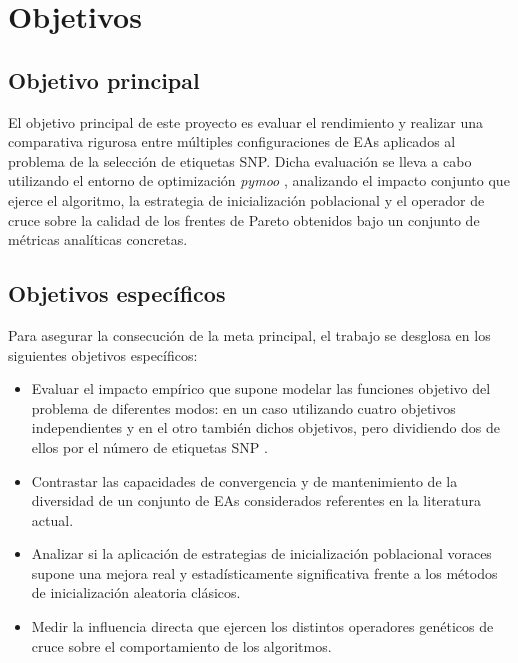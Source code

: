 \chapter{Objetivos}

\section{Objetivo principal}

El objetivo principal de este proyecto es evaluar el rendimiento y realizar una comparativa rigurosa entre múltiples configuraciones de EAs aplicados al problema de la selección de etiquetas SNP. Dicha evaluación se lleva a cabo utilizando el entorno de optimización \textit{pymoo} \cite{pymoo}, analizando el impacto conjunto que ejerce el algoritmo, la estrategia de inicialización poblacional y el operador de cruce sobre la calidad de los frentes de Pareto obtenidos bajo un conjunto de métricas analíticas concretas.

\section{Objetivos específicos}

Para asegurar la consecución de la meta principal, el trabajo se desglosa en los siguientes objetivos específicos:
\begin{itemize}
    \item Evaluar el impacto empírico que supone modelar las funciones objetivo del problema de diferentes modos: en un caso utilizando cuatro objetivos independientes y en el otro también dichos objetivos, pero dividiendo dos de ellos por el número de etiquetas SNP \cite{ting2010multi, moqa2022assessing}.
    \item Contrastar las capacidades de convergencia y de mantenimiento de la diversidad de un conjunto de EAs considerados referentes en la literatura actual.
    \item Analizar si la aplicación de estrategias de inicialización poblacional voraces \cite{ting2010multi, moqa2022assessing} supone una mejora real y estadísticamente significativa frente a los métodos de inicialización aleatoria clásicos.
    \item Medir la influencia directa que ejercen los distintos operadores genéticos de cruce sobre el comportamiento de los algoritmos.
\end{itemize}